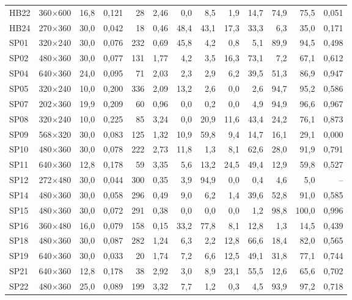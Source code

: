 \begin{table}[htbp]
\begin{tabular}{lllrrrrrrrrrr}
HB22 & 360$\times$600 & 16,8 & 0,121 & 28 & 2,46 & 0,0 & 8,5 & 1,9 & 14,7 & 74,9 & 75,5 & 0,051 \\
HB24 & 270$\times$360 & 30,0 & 0,042 & 18 & 0,46 & 48,4 & 43,1 & 17,3 & 33,3 & 6,3 & 35,0 & 0,171 \\
SP01 & 320$\times$240 & 30,0 & 0,076 & 232 & 0,69 & 45,8 & 4,2 & 0,8 & 5,1 & 89,9 & 94,5 & 0,498 \\
SP02 & 480$\times$360 & 30,0 & 0,077 & 131 & 1,77 & 4,2 & 3,5 & 16,3 & 73,1 & 7,2 & 67,1 & 0,612 \\
SP04 & 640$\times$360 & 24,0 & 0,095 & 71 & 2,03 & 2,3 & 2,9 & 6,2 & 39,5 & 51,3 & 86,9 & 0,947 \\
SP05 & 320$\times$240 & 10,0 & 0,200 & 336 & 2,09 & 13,2 & 2,6 & 0,0 & 2,6 & 94,7 & 95,2 & 0,586 \\
SP07 & 202$\times$360 & 19,9 & 0,209 & 60 & 0,96 & 0,0 & 0,2 & 0,0 & 4,9 & 94,9 & 96,6 & 0,967 \\
SP08 & 320$\times$240 & 10,0 & 0,225 & 85 & 3,24 & 0,0 & 20,9 & 11,6 & 43,4 & 24,2 & 76,1 & 0,873 \\
SP09 & 568$\times$320 & 30,0 & 0,083 & 125 & 1,32 & 10,9 & 59,8 & 9,4 & 14,7 & 16,1 & 29,1 & 0,000 \\
SP10 & 480$\times$360 & 30,0 & 0,078 & 222 & 2,73 & 11,8 & 1,3 & 8,1 & 62,6 & 28,0 & 91,9 & 0,791 \\
SP11 & 640$\times$360 & 12,8 & 0,178 & 59 & 3,35 & 5,6 & 13,2 & 24,5 & 49,4 & 12,9 & 59,8 & 0,527 \\
SP12 & 272$\times$480 & 30,0 & 0,044 & 300 & 0,35 & 3,9 & 94,9 & 0,0 & 0,4 & 4,6 & 5,0 & -- \\
SP14 & 480$\times$360 & 30,0 & 0,058 & 296 & 0,49 & 9,0 & 6,2 & 1,4 & 39,6 & 52,8 & 91,0 & 0,585 \\
SP15 & 480$\times$360 & 30,0 & 0,072 & 291 & 0,38 & 0,0 & 0,0 & 0,0 & 1,2 & 98,8 & 100,0 & 0,996 \\
SP16 & 360$\times$480 & 16,0 & 0,079 & 158 & 0,15 & 33,2 & 77,8 & 8,1 & 12,8 & 1,3 & 14,5 & 0,439 \\
SP18 & 480$\times$360 & 30,0 & 0,087 & 282 & 1,24 & 6,3 & 2,2 & 12,8 & 66,6 & 18,4 & 82,0 & 0,565 \\
SP19 & 640$\times$360 & 30,0 & 0,033 & 20 & 1,74 & 7,2 & 6,6 & 12,5 & 49,1 & 31,8 & 77,1 & 0,744 \\
SP21 & 640$\times$360 & 12,8 & 0,178 & 38 & 2,92 & 3,0 & 8,9 & 23,1 & 55,5 & 12,6 & 65,6 & 0,702 \\
SP22 & 480$\times$360 & 25,0 & 0,089 & 199 & 3,32 & 7,7 & 1,2 & 0,3 & 4,5 & 93,9 & 97,2 & 0,718 \\

\end{tabular}
\end{table}
